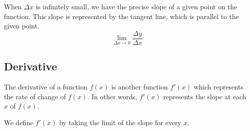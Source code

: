 \documentclass[a4paper]{article}
\begin{document}
\begin{minipage}{0.5\textwidth}
    When \(\Delta x\) is infinitely small, we have the precise slope of a given point
    on the function. This slope is represented by the tangent line, which is parallel to the given point.
    \[
        \lim_{\Delta x \to 0} \frac{\Delta y}{\Delta x}
    \]
\end{minipage}
\begin{minipage}{0.5\textwidth}
\end{minipage}

\subsection{Derivative}

The derivative of a function \(f(x)\) is another function \(f'(x)\) which
represents the rate of change of \(f(x)\). In other words, \(f'(x)\)
represents the slope at each \(x\) of \(f(x)\).

We define \(f'(x)\) by taking the limit of the slope for every \(x\).
\end{document}
